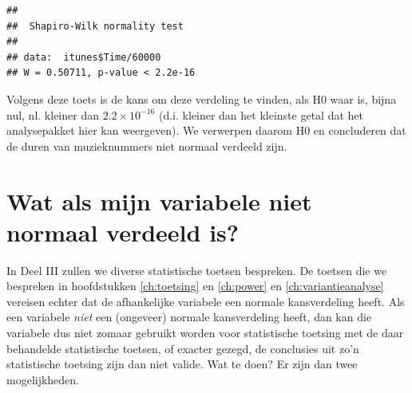 \documentclass[
]{book}
\newenvironment{Shaded}{\begin{snugshade}}{\end{snugshade}}
\newcommand{\CommentTok}[1]{\textcolor[rgb]{0.56,0.35,0.01}{\textit{#1}}}
\newcommand{\DataTypeTok}[1]{\textcolor[rgb]{0.13,0.29,0.53}{#1}}
\newcommand{\DecValTok}[1]{\textcolor[rgb]{0.00,0.00,0.81}{#1}}
\newcommand{\KeywordTok}[1]{\textcolor[rgb]{0.13,0.29,0.53}{\textbf{#1}}}
\newcommand{\NormalTok}[1]{#1}
\newcommand{\OperatorTok}[1]{\textcolor[rgb]{0.81,0.36,0.00}{\textbf{#1}}}
\newcommand{\OtherTok}[1]{\textcolor[rgb]{0.56,0.35,0.01}{#1}}
\newcommand{\StringTok}[1]{\textcolor[rgb]{0.31,0.60,0.02}{#1}}
\begin{document}
\begin{Shaded}
\end{Shaded}

\begin{Shaded}
\end{Shaded}

\begin{verbatim}
## 
##  Shapiro-Wilk normality test
## 
## data:  itunes$Time/60000
## W = 0.50711, p-value < 2.2e-16
\end{verbatim}

Volgens deze toets is de kans om deze verdeling te vinden, als H0 waar
is, bijna nul, nl. kleiner dan \(2.2 \times 10^{-16}\) (d.i. kleiner dan
het kleinste getal dat het analysepakket hier kan weergeven). We
verwerpen daarom H0 en concluderen dat de duren van muzieknummers niet
normaal verdeeld zijn.

\hypertarget{sec:watalsnietnormaal}{%
\section{Wat als mijn variabele niet normaal verdeeld is?}\label{sec:watalsnietnormaal}}

In Deel III zullen we diverse statistische
toetsen bespreken. De toetsen die we bespreken in hoofdstukken
\ref{ch:toetsing} en \ref{ch:power} en \ref{ch:variantieanalyse}
vereisen echter dat de afhankelijke
variabele een normale kansverdeling heeft. Als een variabele \emph{niet} een
(ongeveer) normale kansverdeling heeft, dan kan die variabele dus niet
zomaar gebruikt worden voor statistische toetsing met de daar behandelde
statistische toetsen, of exacter gezegd, de conclusies uit zo'n
statistische toetsing zijn dan niet valide. Wat te doen? Er zijn dan
twee mogelijkheden.
\end{document}
